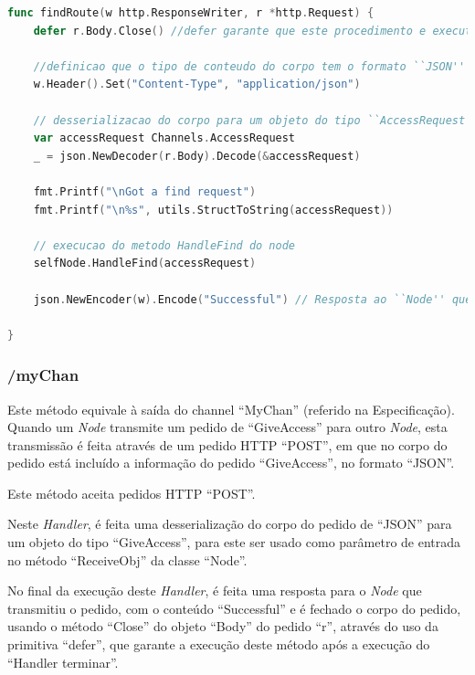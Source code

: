 \begin{lstlisting}[caption={\emph{Handler} ``findRoute'' do método ``/find''},language=Go]
func findRoute(w http.ResponseWriter, r *http.Request) {
	defer r.Body.Close() //defer garante que este procedimento e executado quando a execucao deste ``Handler'' termina

	//definicao que o tipo de conteudo do corpo tem o formato ``JSON''
	w.Header().Set("Content-Type", "application/json")

	// desserializacao do corpo para um objeto do tipo ``AccessRequest''
	var accessRequest Channels.AccessRequest
	_ = json.NewDecoder(r.Body).Decode(&accessRequest)

	fmt.Printf("\nGot a find request")
	fmt.Printf("\n%s", utils.StructToString(accessRequest))

	// execucao do metodo HandleFind do node
	selfNode.HandleFind(accessRequest)

	json.NewEncoder(w).Encode("Successful") // Resposta ao ``Node'' que realizou o pedido \acs{HTTP}

}

\end{lstlisting}


\subsubsection*{/myChan}
Este método equivale à saída do channel ``MyChan'' (referido na Especificação).
Quando um \emph{Node} transmite um pedido de ``GiveAccess'' para outro \emph{Node},
esta transmissão é feita através de um pedido \acs{HTTP} ``POST'', em que no corpo 
do pedido está incluído a informação do pedido ``GiveAccess'', no formato ``JSON''.

Este método aceita pedidos \acs{HTTP} ``POST''.

Neste \emph{Handler}, é feita uma desserialização do corpo do pedido de ``JSON'' para um objeto
do tipo ``GiveAccess'', para este ser usado como parâmetro de entrada no método ``ReceiveObj''
da classe ``Node''.

No final da execução deste \emph{Handler}, é feita uma resposta para o \emph{Node} que transmitiu o pedido, com o conteúdo ``Successful''
e é fechado o corpo do pedido, usando o método ``Close'' do objeto ``Body'' do pedido ``r'',
através do uso da primitiva ``defer'', que garante a execução deste método após a execução do ``Handler terminar''.

